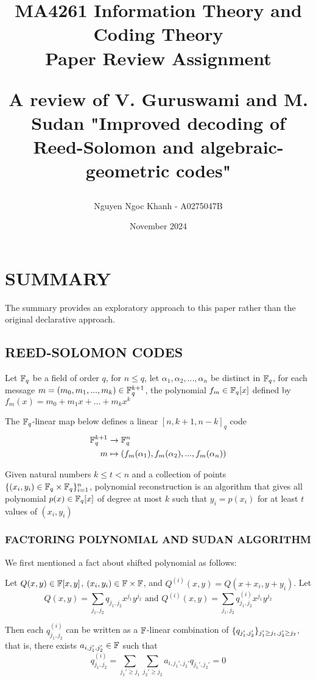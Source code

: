 \documentclass{article}
\title{
MA4261 Information Theory and Coding Theory \\ Paper Review Assignment \\
\begin{large}
    A review of V. Guruswami and M. Sudan "Improved decoding of Reed-Solomon and algebraic-geometric codes"
\end{large}
}
\author{Nguyen Ngoc Khanh - A0275047B}
\date{November 2024}
\begin{document}
\maketitle

\pagebreak

\section{SUMMARY}

The summary provides an exploratory approach to this paper rather than the original declarative approach.

\subsection{REED-SOLOMON CODES}

\begin{definition}
    Let $\mathbb{F}_q$ be a field of order $q$, for $n \leq q$, let $\alpha_1, \alpha_2, ..., \alpha_n$ be distinct in $\mathbb{F}_q$, for each message $m = (m_0, m_1, ..., m_k) \in \mathbb{F}_q^{k+1}$, the polynomial $f_m \in \mathbb{F}_q[x]$ defined by
    $
        f_m(x) = m_0 + m_1 x + ... + m_k x^k
    $

    The $\mathbb{F}_q$-linear map below defines a linear $[n, k+1, n-k]_q$ code
    \begin{align*}
        \mathbb{F}_q^{k+1} &\to \mathbb{F}_q^n \\
        m &\mapsto (f_m(\alpha_1), f_m(\alpha_2), ..., f_m(\alpha_n))
    \end{align*}
\end{definition}

\begin{definition}
    Given natural numbers $k \leq t < n$ and a collection of points $\{(x_i, y_i) \in \mathbb{F}_q \times \mathbb{F}_q\}_{i=1}^n$, polynomial reconstruction is an algorithm that gives all polynomial $p(x) \in \mathbb{F}_q[x]$ of degree at most $k$ such that $y_i = p(x_i)$ for at least $t$ values of $(x_i, y_i)$
\end{definition}

\subsubsection{FACTORING POLYNOMIAL AND SUDAN ALGORITHM}

We first mentioned a fact about shifted polynomial as follows:

\begin{lemma}
    \label{lemma_shifted}
    Let $Q(x, y) \in \mathbb{F}[x, y]$, $(x_i, y_i) \in \mathbb{F} \times \mathbb{F}$, and $Q^{(i)}(x, y) = Q(x + x_i, y + y_i)$. Let
    $$
        Q(x, y) = \sum_{j_1, j_2} q_{j_1, j_2} x^{j_1} y^{j_2} \text{ and } Q^{(i)}(x, y) = \sum_{j_1, j_2} q^{(i)}_{j_1, j_2} x^{j_1} y^{j_2}
    $$

    Then each $q_{j_1, j_2}^{(i)}$ can be written as a $\mathbb{F}$-linear combination of $\{q_{j_1', j_2'}\}_{j_1' \geq j_1, j_2' \geq j_2}$, that is, there exists $a_{i, j_1', j_2'} \in \mathbb{F}$ such that
    $$
        q^{(i)}_{j_1, j_2} = \sum_{j_1' \geq j_1} \sum_{j_2' \geq j_2} a_{i, j_1', j_2'} q_{j_1', j_2'}= 0
    $$
\end{lemma}
\end{document}
